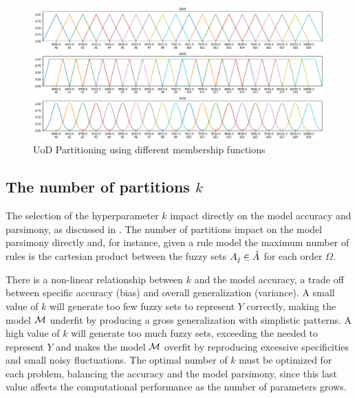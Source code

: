\begin{figure}
    \centering
    \includegraphics[width=\textwidth]{figures/membership.png}
    \caption{UoD Partitioning using different membership functions}
    \label{fig:membership}
\end{figure}

%
\subsection{The number of partitions $k$}
\label{sec:fts_partitions}

The selection of the hyperparameter $k$ impact directly on the model accuracy and parsimony, as discussed in \cite{Duru2012}. The number of partitions impact on the model parsimony directly and, for instance, given a rule model the maximum number of rules is the cartesian product between the fuzzy sets $A_j \in \tilde{A}$ for each order $\Omega$. 

There is a non-linear relationship between $k$ and the model accuracy, a trade off between specific accuracy (bias) and overall generalization (variance). A small value of $k$ will generate too few fuzzy sets to represent $Y$ correctly, making the model $\mathcal{M}$ underfit by producing a gross generalization with simplistic patterns. A high value of $k$ will generate too much fuzzy sets, exceeding the needed to represent $Y$ and makes the model $\mathcal{M}$ overfit by reproducing excessive specificities and small noisy fluctuations. The optimal number of $k$ must be optimized for each problem, balancing the accuracy and the model parsimony, since this last value affects the computational performance as the number of parameters grows.

